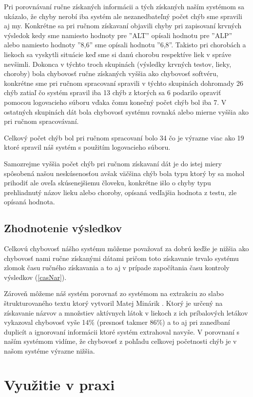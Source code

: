 Pri porovnávaní ručne získaných informácii a tých získaných naším systémom sa ukázalo, že chyby nerobí iba systém ale nezanedbateľný počet chýb sme spravili aj my. Konkrétne sa pri ručnom získavaní objavili chyby pri zapisovaní krvných výsledok kedy sme namiesto hodnoty pre ''ALT'' opísali hodnotu pre ''ALP'' alebo namiesto hodnoty ''8,6'' sme opísali hodnotu ''6,8''. Takisto pri chorobách a liekoch sa vyskytli situácie keď sme si danú chorobu respektíve liek v správe nevšimli. Dokonca v týchto troch skupinách (výsledky krvných testov, lieky, choroby) bola chybovosť ručne získaných vyššia ako chybovosť softvéru, konkrétne sme pri ručnom spracovaní spravili v týchto skupinách dohromady 26 chýb zatiaľ čo systém spravil iba 13 chýb z ktorých sa 6 podarilo opraviť pomocou logovacieho súboru vďaka čomu konečný počet chýb bol iba 7. V ostatných skupinách dát bola chybovosť systému rovnaká alebo mierne vyššia ako pri ručnom spracovávaní. 

Celkový počet chýb bol pri ručnom spracovaní bolo 34 čo je výrazne viac ako 19 ktoré spravil náš systém s použitím logovacieho súboru.  

Samozrejme vyššia počet chýb pri ručnom získavaní dát je do istej miery spôsobená našou neskúsenosťou avšak väčšina chýb bola typu ktorý by sa mohol prihodiť ale oveľa skúsenejšiemu človeku, konkrétne išlo o chyby typu prehliadnutý názov lieku alebo choroby, opísaná vedľajšia hodnota z testu, zle opísaná hodnota.

 
\subsection{Zhodnotenie výsledkov}

Celkovú chybovosť nášho systému môžeme považovať za dobrú keďže je nižšia ako chybovosť nami ručne získanými dátami pričom toto získavanie trvalo systému zlomok času ručného získavania a to aj v prípade započítania času kontroly výsledkov (\ref{casNar}).

Zároveň môžeme náš systém porovnať zo systémom na extrakciu zo slabo štrukturovaného textu ktorý vytvoril Matej Minárik \cite{extrSlabo}. Ktorý je určený na získavanie názvov a množstiev aktívnych látok v liekoch z ich príbalových letákov vykazoval chybovosť vyše 14\% (presnosť takmer 86\%) a to aj pri zanedbaní duplicít a ignorovaní informácii ktoré systém extrahoval navyše. V porovnaní s naším systémom vidíme, že chybovosť z pohľadu celkovej početnosti chýb je v našom systéme výrazne nižšia. 


\section{Využitie v praxi}


